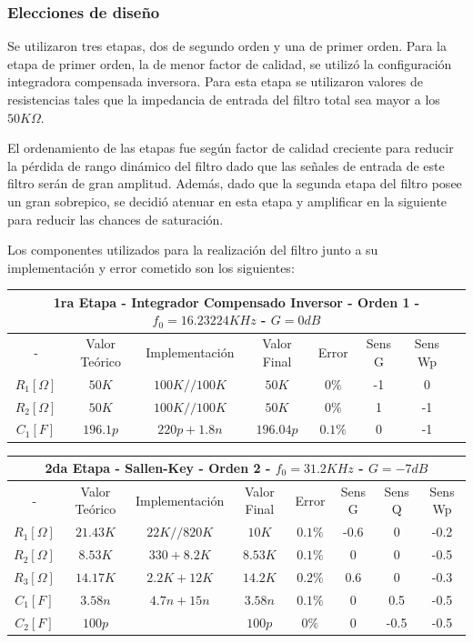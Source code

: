 \subsubsection{Elecciones de diseño}

Se utilizaron tres etapas, dos de segundo orden y una de primer orden. Para la etapa de primer orden, la de menor factor de calidad, se utilizó la configuración integradora compensada inversora. Para esta etapa se utilizaron valores de resistencias tales que la impedancia de entrada del filtro total sea mayor a los $50K\Omega$.

El ordenamiento de las etapas fue según factor de calidad creciente para reducir la pérdida de rango dinámico del filtro dado que las señales de entrada de este filtro serán de gran amplitud. Además, dado que la segunda etapa del filtro posee un gran sobrepico, se decidió atenuar en esta etapa y amplificar en la siguiente para reducir las chances de saturación.

Los componentes utilizados para la realización del filtro junto a su implementación y error cometido son los siguientes:

\begin{table}[H]
\centering
\begin{tabular}{@{}cccccccc@{}}
\multicolumn{8}{c}{1ra Etapa - Integrador Compensado Inversor - Orden 1 - $f_0 = 16.23224KHz$ - $G=0dB$} \\ \midrule
- & Valor Teórico & Implementación & Valor Final & Error & Sens G  & Sens Wp \\ \midrule
$R_1 [\Omega]$ & $50K$ & $100K//100K$ & $50K$ & $0\%$ & -1 & 0 \\
$R_2 [\Omega]$ & $50K$ & $100K//100K$ & $50K$ & $0\%$ & 1 & -1 \\
$C_1 [F]$ & $196.1p$ & $220p+1.8n$ & $196.04p$ & $0.1\%$ & 0 & -1 \\
\bottomrule
\end{tabular}
\end{table}

\begin{table}[H]
\centering
\begin{tabular}{@{}cccccccc@{}}
\multicolumn{8}{c}{2da Etapa - Sallen-Key - Orden 2 - $f_0 = 31.2KHz$ - $G=-7dB$} \\ \midrule
- & Valor Teórico & Implementación & Valor Final & Error & Sens G & Sens Q & Sens Wp \\ \midrule
$R_1 [\Omega]$ & $21.43K$ & $22K//820K$ & $10K$ & $0.1\%$ & -0.6 & 0 & -0.2 \\
$R_2 [\Omega]$ & $8.53K$ & $330+8.2K$ & $8.53K$ & $0.1\%$ & 0 & 0 & -0.5 \\
$R_3 [\Omega]$ & $14.17K$ & $2.2K+12K$ & $14.2K$ & $0.2\%$ & 0.6 & 0 & -0.3 \\
$C_1 [F]$ & $3.58n$ & $4.7n+15n$ & $3.58n$ & $0.1\%$ & 0 & 0.5 & -0.5 \\
$C_2 [F]$ & $100p$ &  & $100p$ & $0\%$ & 0 & -0.5 & -0.5 \\ \bottomrule
\end{tabular}
\end{table}
 
